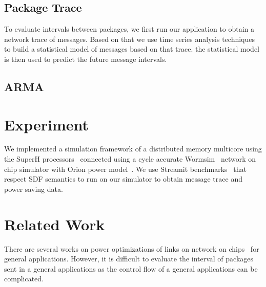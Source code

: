 \documentclass[12pt]{article}
\begin{document}
\subsection{Package Trace}
To evaluate intervals between packages, we first run our application to obtain a
network trace of messages. Based on that we use time series analysis
techniques~\cite{} to build a statistical model of messages based on that trace.
the statistical model is then used to predict the future message intervals.

\subsection{ARMA}

\section{Experiment}
We implemented a simulation framework of a distributed memory multicore using
the SuperH processors~\cite{Stanley-MarbellSunflower} connected using a
cycle accurate Wormsim~\cite{Wormsim} network on chip simulator with Orion power
model~\cite{WangOrion}. We use Streamit benchmarks~\cite{ThiesStreamIt} that
respect SDF semantics to run on our simulator to obtain message trace and power
saving data.

\section{Related Work}
There are several works on power optimizations of links on network on
chips~\cite{LiCompilerDirected, LiProfileDriven,MuralidharaCommBased} for
general applications. However, it is difficult to evaluate the interval of
packages sent in a general applications as the control flow of a general
applications can be complicated.



\end{document}
